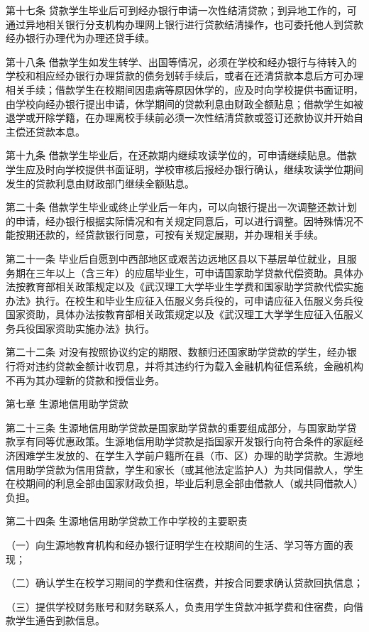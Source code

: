 \documentclass[UTF8,12pt,a4paper]{report}
\begin{document}
第十七条 贷款学生毕业后可到经办银行申请一次性结清贷款；到异地工作的，可通过异地相关银行分支机构办理网上银行进行贷款结清操作，也可委托他人到贷款经办银行办理代为办理还贷手续。

第十八条 借款学生如发生转学、出国等情况，必须在学校和经办银行与待转入的学校和相应经办银行办理贷款的债务划转手续后，或者在还清贷款本息后方可办理相关手续；借款学生在校期间因患病等原因休学的，应及时向学校提供书面证明，由学校向经办银行提出申请，休学期间的贷款利息由财政全额贴息；借款学生如被退学或开除学籍，在办理离校手续前必须一次性结清贷款或签订还款协议并开始自主偿还贷款本息。

第十九条 借款学生毕业后，在还款期内继续攻读学位的，可申请继续贴息。借款学生应及时向学校提供书面证明，学校审核后报经办银行确认，继续攻读学位期间发生的贷款利息由财政部门继续全额贴息。

第二十条 借款学生毕业或终止学业后一年内，可以向银行提出一次调整还款计划的申请，经办银行根据实际情况和有关规定同意后，可以进行调整。因特殊情况不能按期还款的，经贷款银行同意，可按有关规定展期，并办理相关手续。

第二十一条 毕业后自愿到中西部地区或艰苦边远地区县以下基层单位就业，且服务期在三年以上（含三年）的应届毕业生，可申请国家助学贷款代偿资助。具体办法按教育部相关政策规定以及《武汉理工大学毕业生学费和国家助学贷款代偿实施办法》执行。在校生和毕业生应征入伍服义务兵役的，可申请应征入伍服义务兵役国家资助，具体办法按教育部相关政策规定以及《武汉理工大学学生应征入伍服义务兵役国家资助实施办法》执行。

第二十二条 对没有按照协议约定的期限、数额归还国家助学贷款的学生，经办银行将对违约贷款金额计收罚息，并将其违约行为载入金融机构征信系统，金融机构不再为其办理新的贷款和授信业务。

第七章 生源地信用助学贷款

第二十三条 生源地信用助学贷款是国家助学贷款的重要组成部分，与国家助学贷款享有同等优惠政策。生源地信用助学贷款是指国家开发银行向符合条件的家庭经济困难学生发放的、在学生入学前户籍所在县（市、区）办理的助学贷款。生源地信用助学贷款为信用贷款，学生和家长（或其他法定监护人）为共同借款人，学生在校期间的利息全部由国家财政负担，毕业后利息全部由借款人（或共同借款人）负担。

第二十四条 生源地信用助学贷款工作中学校的主要职责

（一）向生源地教育机构和经办银行证明学生在校期间的生活、学习等方面的表现；

（二）确认学生在校学习期间的学费和住宿费，并按合同要求确认贷款回执信息；

（三）提供学校财务账号和财务联系人，负责用学生贷款冲抵学费和住宿费，向借款学生通告到款信息。
\end{document}
